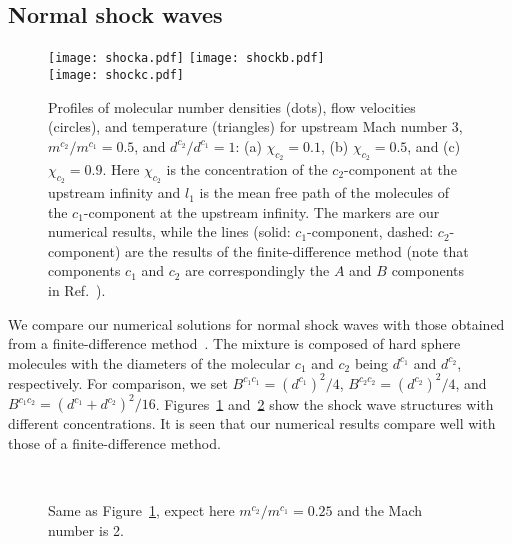 \subsection{Normal shock waves}


\begin{figure}[tb]
  \centering
  \texttt{[image: shocka.pdf]}
  \hskip 0.8cm
  \texttt{[image: shockb.pdf]} \\
  \vskip 0.1cm
  \texttt{[image: shockc.pdf]}\\
  \caption[Profiles of molecular number densities (dots), flow velocities (circles), and temperature (triangles) for upstream Mach number 3, $m^{c_2}/m^{c_1}=0.5$, and $d^{c_2}/d^{c_1}=1$: (a) $\chi_{c_2}=0.1$, (b) $\chi_{c_2}=0.5$, and (c) $\chi_{c_2}=0.9$.]{Profiles of molecular number densities (dots), flow velocities (circles), and temperature (triangles) for upstream Mach number 3, $m^{c_2}/m^{c_1}=0.5$, and $d^{c_2}/d^{c_1}=1$: (a) $\chi_{c_2}=0.1$, (b) $\chi_{c_2}=0.5$, and (c) $\chi_{c_2}=0.9$. Here $\chi_{c_2}$ is the concentration of the $c_2$-component at the upstream infinity and $l_1$ is the mean free path of the molecules of the $c_1$-component at the upstream infinity. The markers are our numerical results, while the lines (solid: $c_1$-component, dashed: $c_2$-component) are the results of the finite-difference method (note that components $c_1$ and $c_2$ are correspondingly the $A$ and $B$ components in Ref.~\cite{Kosuge2001}). }
  \label{shock2}
\end{figure}

We compare our numerical solutions for normal shock waves with those obtained from a finite-difference method~\cite{Kosuge2001}. The mixture is composed of hard sphere molecules with the diameters of the molecular $c_1$ and $c_2$ being $d^{c_1}$ and $d^{c_2}$, respectively. For comparison, we set $B^{c_1c_1}=(d^{c_1})^2/4$, $B^{c_2c_2}=(d^{c_2})^2/4$, and $B^{c_1c_2}=(d^{c_1}+d^{c_2})^2/16$. Figures~\ref{shock2} and~\ref{shock4} show the shock wave structures with different concentrations. It is seen that our numerical results compare well with those of a finite-difference method.


\begin{figure}[th]
  \centering
  \hskip 0.8cm
  \\
  \vskip 0.4cm
  \caption[Profiles of molecular number densities (dots), flow velocities (circles), and temperature (triangles) for upstream Mach number 2, $m^{c_2}/m^{c_1}=0.25$, and $d^{c_2}/d^{c_1}=1$: (a) $\chi_{c_2}=0.1$, (b) $\chi_{c_2}=0.5$, and (c) $\chi_{c_2}=0.9$.]{Same as Figure~\ref{shock2}, expect here $m^{c_2}/m^{c_1}=0.25$ and the Mach number is 2. }
  \label{shock4}
\end{figure}


